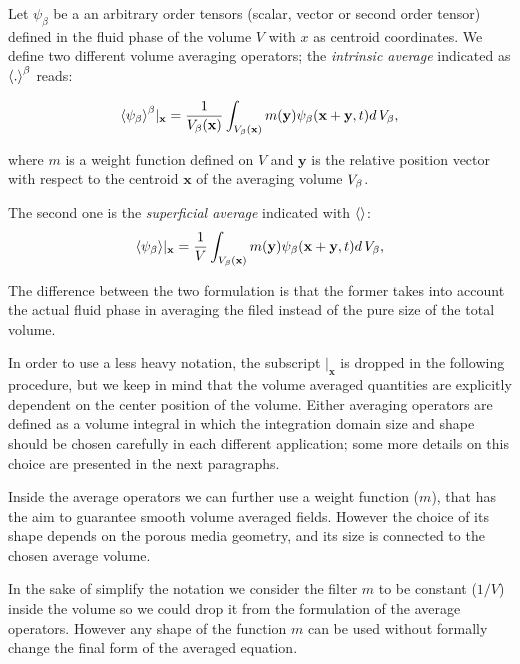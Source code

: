 Let $\psi_{\beta}$ be a an arbitrary order tensors (scalar, vector or second order tensor) defined in the fluid phase of the volume $V$ with $x$ as centroid coordinates.
We define two different volume averaging operators; the \textit{intrinsic average} indicated as ${\left< . \right>}^{\beta}$ reads:

\begin{equation}
	{\left< \psi_{\beta} \right>}^{\beta}|_{\mathbf{x}} = \dfrac{1}{V_\beta(\mathbf{x})} \int_{V_\beta(\mathbf{x})}  m(\mathbf{y}) \psi_{\beta}(\mathbf{x}+\mathbf{y}, t) d \, V_\beta,
	\label{eq:avg_intrinsic}
\end{equation}

where $m$ is a weight function defined on $V$ and $\mathbf{y}$ is the relative position vector with respect to the centroid $\mathbf{x}$ of the averaging volume $V_\beta$.

The second one is the \textit{superficial average} indicated with ${\left<  \right>}$:
\begin{equation}
	{\left< \psi_{\beta} \right>}|_{\mathbf{x}} = \dfrac{1}{V} \int_{V_\beta(\mathbf{x})} m(\mathbf{y}) \psi_{\beta}(\mathbf{x}+\mathbf{y}, t) d \, V_\beta,
	\label{eq:avg_superficial}
\end{equation}

The difference between the two formulation is that the former takes into account the actual fluid phase in averaging the filed instead of the pure size of the total volume.

In order to use a less heavy notation, the subscript $|_{\mathbf{x}}$ is dropped in the following procedure, but we keep in mind that the volume averaged quantities are explicitly dependent on the center position of the volume.
Either averaging operators are defined as a volume integral in which the integration domain size and shape should be chosen carefully in each different application; some more details on this choice are presented in the next paragraphs.

Inside the average operators we can further use a weight function ($m$), that has the aim to guarantee smooth volume averaged fields.
However the choice of its shape depends on the porous media geometry, and its size is connected to the chosen average volume.

In the sake of simplify the notation we consider the filter $m$ to be constant ($1/V$) inside the volume so we could drop it from the formulation of the average operators.
However any shape of the function $m$ can be used without formally change the final form of the averaged equation.

